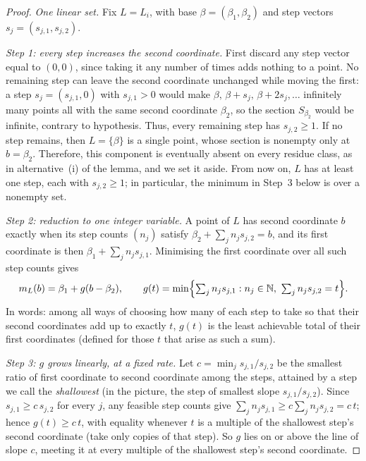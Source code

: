 \documentclass[11pt]{article}
\theoremstyle{definition}
\newcommand{\N}{\mathbb N}
\begin{document}
\begin{proof}
\vspace{0.5em}
\noindent\emph{One linear set.}  Fix $L=L_i$, with base
$\beta=(\beta_1,\beta_2)$ and step vectors $s_j=(s_{j,1},s_{j,2})$.

\vspace{0.5em}
\noindent\emph{Step 1: every step increases the second coordinate.}  First discard any
step vector equal to $(0,0)$, since taking it any number of times adds nothing to
a point.  No remaining step can leave the second coordinate
unchanged while moving the first: a step $s_j=(s_{j,1},0)$ with $s_{j,1}>0$ would
make $\beta,\,\beta+s_j,\,\beta+2s_j,\ldots$ infinitely many points all with the
same second coordinate $\beta_2$, so the section $S_{\beta_2}$ would be infinite,
contrary to hypothesis.  Thus, every remaining step has $s_{j,2}\ge 1$.  If no
step remains, then $L=\{\beta\}$ is a single point, whose section is nonempty only
at $b=\beta_2$.  Therefore, this component is eventually absent on every residue
class, as in alternative~(i) of the lemma, and we set it aside.  From now on,
$L$ has at least one step, each with $s_{j,2}\ge 1$; in particular, the minimum
in Step~3 below is over a nonempty set.

\vspace{0.5em}
\noindent
\emph{Step 2: reduction to one integer variable.}  A point of $L$ has second
coordinate $b$ exactly when its step counts $(n_j)$ satisfy
$\beta_2+\sum_j n_j s_{j,2}=b$, and its first coordinate is then
$\beta_1+\sum_j n_j s_{j,1}$.  Minimising the first coordinate over all such step
counts gives
\[
   m_L(b)=\beta_1+g(b-\beta_2),\qquad
   g(t)=\min\Bigl\{\textstyle\sum_j n_j s_{j,1}: n_j\in\N,\ \sum_j n_j s_{j,2}=t\Bigr\}.
\]
In words: among all ways of choosing how many of each step to take so that their
second coordinates add up to exactly $t$, $g(t)$ is the least achievable total of
their first coordinates (defined for those $t$ that arise as such a sum).

\vspace{0.5em}
\noindent\emph{Step 3: $g$ grows linearly, at a fixed rate.}  Let
$c=\min_j s_{j,1}/s_{j,2}$ be the smallest ratio of first coordinate to second
coordinate among the steps, attained by a step we call the \emph{shallowest}
(in the picture, the step of smallest slope $s_{j,1}/s_{j,2}$).  Since
$s_{j,1}\ge c\,s_{j,2}$ for every $j$, any feasible step counts give
$\sum_j n_j s_{j,1}\ge c\sum_j n_j s_{j,2}=c\,t$; hence $g(t)\ge c\,t$, with
equality whenever $t$ is a multiple of the shallowest step's second coordinate
(take only copies of that step).  So $g$ lies on or above the line of slope $c$,
meeting it at every multiple of the shallowest step's second coordinate.


\end{proof}
\end{document}
